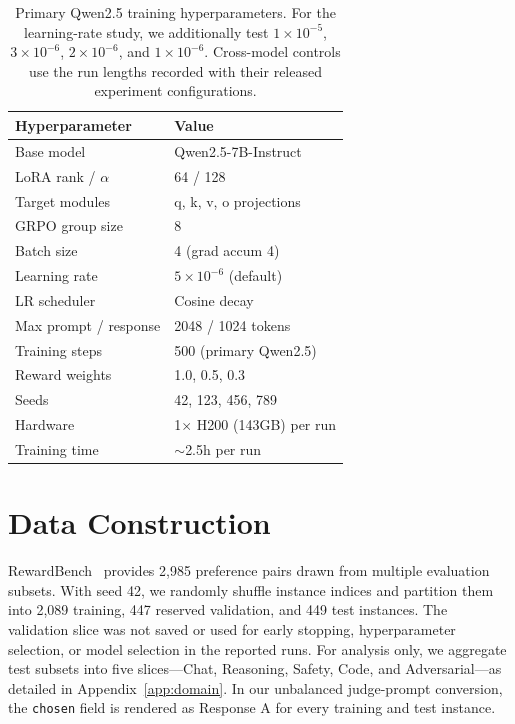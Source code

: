 \documentclass[letterpaper]{article}
\begin{document}
\begin{table}[H]
\centering
\footnotesize
\begin{tabular}{ll}
\toprule
\textbf{Hyperparameter} & \textbf{Value} \\
\midrule
Base model & Qwen2.5-7B-Instruct \\
LoRA rank / $\alpha$ & 64 / 128 \\
Target modules & q, k, v, o projections \\
GRPO group size & 8 \\
Batch size & 4 (grad accum 4) \\
Learning rate & $5 \times 10^{-6}$ (default) \\
LR scheduler & Cosine decay \\
Max prompt / response & 2048 / 1024 tokens \\
Training steps & 500 (primary Qwen2.5) \\
Reward weights & 1.0, 0.5, 0.3 \\
Seeds & 42, 123, 456, 789 \\
Hardware & 1$\times$ H200 (143GB) per run \\
Training time & $\sim$2.5h per run \\
\bottomrule
\end{tabular}
\caption{Primary Qwen2.5 training hyperparameters. For the learning-rate study, we additionally test $1 \times 10^{-5}$, $3 \times 10^{-6}$, $2 \times 10^{-6}$, and $1 \times 10^{-6}$. Cross-model controls use the run lengths recorded with their released experiment configurations.}
\label{tab:hparams}
\end{table}

\section{Data Construction}
\label{app:data}

RewardBench~\citep{lambert2024rewardbench} provides 2,985 preference pairs drawn from multiple evaluation subsets. With seed 42, we randomly shuffle instance indices and partition them into 2,089 training, 447 reserved validation, and 449 test instances. The validation slice was not saved or used for early stopping, hyperparameter selection, or model selection in the reported runs. For analysis only, we aggregate test subsets into five slices---Chat, Reasoning, Safety, Code, and Adversarial---as detailed in Appendix~\ref{app:domain}. In our unbalanced judge-prompt conversion, the \texttt{chosen} field is rendered as Response A for every training and test instance.
\end{document}
